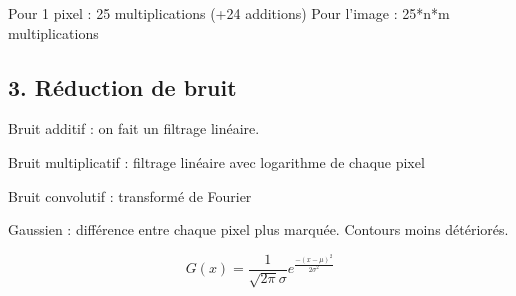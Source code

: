 \documentclass{report}
\begin{document}
Pour 1 pixel : 25 multiplications (+24 additions)
Pour l'image : 25*n*m multiplications

	\subsection*{3. Réduction de bruit}

Bruit additif : on fait un filtrage linéaire.

Bruit multiplicatif : filtrage linéaire avec logarithme de chaque pixel

Bruit convolutif : transformé de Fourier

Gaussien : différence entre chaque pixel plus marquée. Contours moins détériorés.

\[G(x)= \frac{1}{\sqrt{2 \pi}\sigma}e^{\frac{-(x-\mu)^{2}}{2\sigma^{2}}}\]
\end{document}
